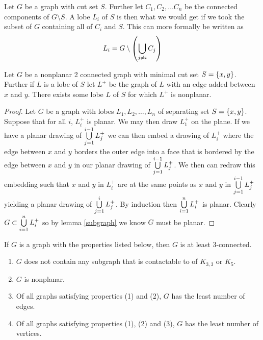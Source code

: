 \documentclass{article}
\begin{document}
\begin{definition}[lobe]
	Let $G$ be a graph with cut set $S$. Further let $C_1, C_2, \ldots C_n$ be the connected components of $G\setminus S$. A lobe $L_i$ of $S$ is then what we would get if we took the subset of $G$ containing all of $C_i$ and $S$. This can more formally be written as
	$$
	L_i = G\setminus \left(\bigcup\limits_{j\not=i}^{}  {C_j} \right)
	$$
\end{definition}

\begin{lemma}\label{lobes}
	Let $G$ be a nonplanar 2 connected graph with minimal cut set $S=\left\{ {x,y} \right\}$. Further if $L$ is a lobe of $S$ let $L^+$ be the graph of $L$ with an edge added between $x$ and $y$. There exists some lobe $L$ of $S$ for which $L^+$ is nonplanar. 
\end{lemma}
\begin{proof}
	Let $G$ be a graph with lobes $L_1, L_2, \ldots, L_n$ of separating set $S=\left\{ {x,y} \right\}$. Suppose that for all $i$, $L_i^+$ is planar. We may then draw $L_1^+$ on the plane. If we have a planar drawing of $\bigcup\limits_{j = 1}^{i-1}  {L_j^+} $ we can then embed a drawing of $L_i^+$ where the edge between $x$ and $y$ borders the outer edge into a face that is bordered by the edge between $x$ and $y$ in our planar drawing of $\bigcup\limits_{j = 1}^{i-1}  {L_j^+} $. We then can redraw this embedding such that $x$ and $y$ in $L_i^+$ are at the same points as $x$ and $y$ in $\bigcup\limits_{j = 1}^{i-1}  {L_j^+} $ yielding a planar drawing of $\bigcup\limits_{j=1}^{i}  {L_j^+} $. By induction then $\bigcup\limits_{i=1}^{n}  {L_i^+} $ is planar. Clearly $G \subset \bigcup\limits_{i=1}^{n}  {L_i^+} $ so by lemma \ref{subgraph} we know $G$ must be planar.
\end{proof}

\begin{lemma}\label{3connect}
	If $G$ is a graph with the properties listed below, then $G$ is at least 3-connected.
	\begin{enumerate}
		\item $G$ does not contain any subgraph that is contactable to of $K_{3,3}$ or $K_5$.
		\item $G$ is nonplanar.
		\item Of all graphs satisfying properties (1) and (2), $G$ has the least number of edges.
		\item Of all graphs satisfying properties (1), (2) and (3), $G$ has the least number of vertices.
	\end{enumerate}
\end{lemma}
\end{document}
